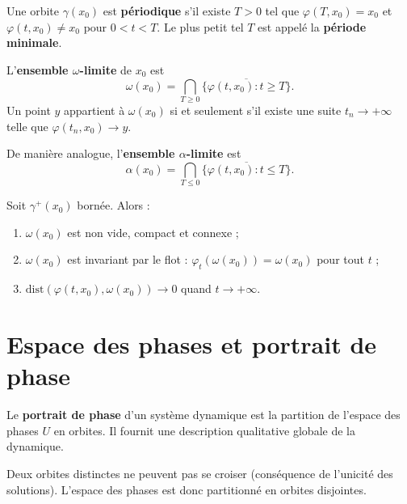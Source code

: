\begin{definition}
Une orbite $\gamma(x_0)$ est \textbf{p\'eriodique} s'il existe $T > 0$ tel que
$\varphi(T, x_0) = x_0$ et $\varphi(t, x_0) \neq x_0$ pour $0 < t < T$.
Le plus petit tel $T$ est appel\'e la \textbf{p\'eriode minimale}.
\end{definition}

\begin{definition}
L'\textbf{ensemble $\omega$-limite} de $x_0$ est
\[
    \omega(x_0) = \bigcap_{T \geq 0} \overline{\{\varphi(t, x_0) : t \geq T\}}.
\]
Un point $y$ appartient \`a $\omega(x_0)$ si et seulement s'il existe une suite
$t_n \to +\infty$ telle que $\varphi(t_n, x_0) \to y$.
\end{definition}

\begin{definition}
De mani\`ere analogue, l'\textbf{ensemble $\alpha$-limite} est
\[
    \alpha(x_0) = \bigcap_{T \leq 0} \overline{\{\varphi(t, x_0) : t \leq T\}}.
\]
\end{definition}

\begin{proposition}
\label{prop:omega-props}
Soit $\gamma^+(x_0)$ born\'ee. Alors :
\begin{enumerate}
    \item $\omega(x_0)$ est non vide, compact et connexe ;
    \item $\omega(x_0)$ est invariant par le flot : $\varphi_t(\omega(x_0)) = \omega(x_0)$ pour tout $t$ ;
    \item $\mathrm{dist}(\varphi(t, x_0), \omega(x_0)) \to 0$ quand $t \to +\infty$.
\end{enumerate}
\end{proposition}

\section{Espace des phases et portrait de phase}

\begin{definition}
Le \textbf{portrait de phase} d'un syst\`eme dynamique est la partition de
l'espace des phases $U$ en orbites. Il fournit une description qualitative
globale de la dynamique.
\end{definition}

\begin{remarque}
Deux orbites distinctes ne peuvent pas se croiser (cons\'equence de l'unicit\'e
des solutions). L'espace des phases est donc partitionn\'e en orbites
disjointes.
\end{remarque}


